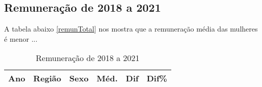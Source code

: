 \subsection{Remuneração de 2018 a 2021}

A tabela abaixo \ref{remunTotal} nos mostra que a remuneração média das mulheres é menor ...

\begin{table}[htbp]
	\caption{Remuneração de 2018 a 2021}
	\begin{center}
		\begin{tabular}{|c|c|c|c|c|c|}
			\hline
			\textbf{Ano} & \textbf{Região} & \textbf{Sexo} & \textbf{Méd.} & \textbf{Dif} & \textbf{Dif\%} \\ 
			\hline																			
																																																																							

\end{tabular}
\end{center}
\end{table}
